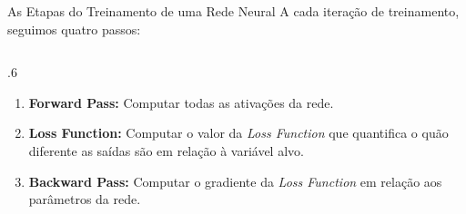 \documentclass[aspectratio=169, xcolor=dvipsnames]{beamer}
\begin{document}
  \begin{frame}{As Etapas do Treinamento de uma Rede Neural}
    A cada iteração de treinamento, seguimos quatro passos:

    \begin{columns}
      \begin{column}{.6\linewidth}
        \begin{enumerate}
          \item {} \textbf{Forward Pass:} Computar todas as ativações
            da rede.

          \item {}\textbf{Loss Function:} Computar o valor da
            \textit{Loss Function} que quantifica o quão diferente as saídas são
            em relação à variável alvo.

          \item {}\textbf{Backward Pass:} Computar o gradiente
            da \textit{Loss Function} em relação aos parâmetros da rede.


\end{enumerate}
\end{column}
\end{columns}
\end{frame}
\end{document}
